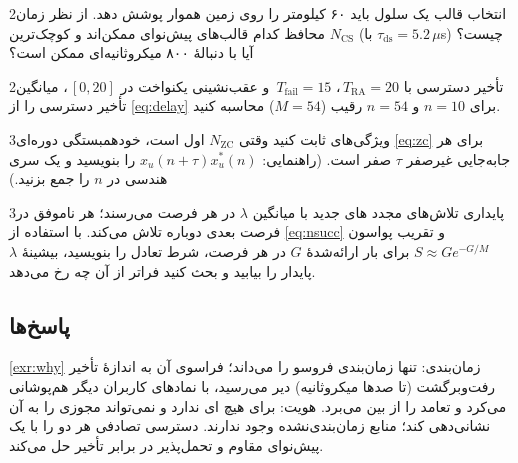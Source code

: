 \documentclass[11pt,a4paper]{article}
\begin{document}
\begin{exercisebox}{2}{انتخاب قالب}\label{exr:format}
یک سلول باید ۶۰ کیلومتر را روی زمین هموار پوشش دهد. از نظر زمان محافظ کدام قالب‌های پیش‌نوای  ممکن‌اند و
کوچک‌ترین $N_{\mathrm{CS}}$ (با $\tau_{\mathrm{ds}} = 5.2\,\mu$s) چیست؟ آیا با دنبالهٔ ۸۰۰ میکروثانیه‌ای ممکن است؟
\end{exercisebox}

\begin{exercisebox}{2}{تأخیر دسترسی}\label{exr:delay}
با $T_{\mathrm{RA}} = 20$\,، $T_{\mathrm{fail}} = 15$\, و عقب‌نشینی یکنواخت در $[0,20]$\,، میانگین
تأخیر دسترسی را از \cref{eq:delay} برای $n = 10$ و $n = 54$ رقیب ($M = 54$) محاسبه کنید.
\end{exercisebox}

\begin{exercisebox}{3}{ویژگی‌های }\label{exr:zc}
ثابت کنید وقتی $N_{\mathrm{ZC}}$ اول است، خودهمبستگی دوره‌ای \cref{eq:zc} برای هر جابه‌جایی غیرصفر $\tau$ صفر است.
(راهنمایی: $x_u(n+\tau)x_u^\ast(n)$ را بنویسید و یک سری هندسی در $n$ را جمع بزنید.)
\end{exercisebox}

\begin{exercisebox}{3}{پایداری تلاش‌های مجدد}\label{exr:stab}
های جدید با میانگین $\lambda$ در هر فرصت  می‌رسند؛ هر  ناموفق در فرصت بعدی دوباره تلاش
می‌کند. با استفاده از \cref{eq:nsucc} و تقریب پواسون $S \approx G e^{-G/M}$ برای بار ارائه‌شدهٔ $G$ در هر فرصت، شرط
تعادل را بنویسید، بیشینهٔ $\lambda$ پایدار را بیابید و بحث کنید فراتر از آن چه رخ می‌دهد.
\end{exercisebox}

\subsection*{پاسخ‌ها}

\begin{solutionbox}{\ref{exr:why}}
زمان‌بندی:  تنها زمان‌بندی فروسو را می‌داند؛ فراسوی آن به اندازهٔ تأخیر رفت‌وبرگشت (تا صدها میکروثانیه) دیر
می‌رسید، با نمادهای  کاربران دیگر هم‌پوشانی می‌کرد و تعامد را از بین می‌برد. هویت:  برای
 هیچ ای ندارد و نمی‌تواند مجوزی را به آن نشانی‌دهی کند؛ منابع  زمان‌بندی‌نشده وجود ندارند.
دسترسی تصادفی هر دو را با یک پیش‌نوای مقاوم و تحمل‌پذیر در برابر تأخیر حل می‌کند.
\end{solutionbox}
\end{document}
